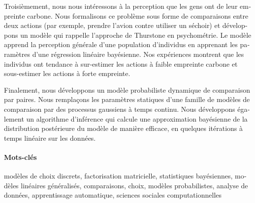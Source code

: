 \begin{otherlanguage}{french}
	Troisièmement, nous nous intéressons à la perception que les gens ont de leur empreinte carbone.
	Nous formalisons ce problème sous forme de comparaisons entre deux actions (par exemple, prendre l'avion contre utiliser un séchoir) et développons un modèle qui rappelle l'approche de Thurstone en psychométrie.
	Le modèle apprend la perception générale d'une population d'individus en apprenant les paramètres d'une régression linéaire bayésienne.
	Nos expériences montrent que les individus ont tendance à sur-estimer les actions à faible empreinte carbone et sous-estimer les actions à forte empreinte.

	Finalement, nous développons un modèle probabiliste dynamique de comparaison par paires.
	Nous remplaçons les paramètres statiques d'une famille de modèles de comparaison par des processus gaussiens à temps continu.
	Nous développons également un algorithme d'inférence qui calcule une approximation bayésienne de la distribution postérieure du modèle de manière efficace, en quelques itérations à temps linéaire sur les données.

	\paragraph{Mots-clés}
	modèles de choix discrets, factorisation matricielle, statistiques bayésiennes, modèles linéaires généralisés, comparaisons, choix, modèles probabilistes, analyse de données, apprentissage automatique, sciences sociales computationnelles
\end{otherlanguage}
